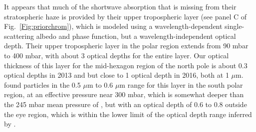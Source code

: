 \documentclass[article,11pt]{emulateapj}
\def\mum{$\mu$m }
\def\mumx{$\mu$m}
\begin{document}
It appears that much of the shortwave
absorption that is missing from their stratospheric haze is provided
by their upper tropospheric layer (see panel C of
Fig.\ \ref{Fig:priorchrom}), which is modeled using a wavelength-dependent 
single-scattering albedo and phase function, but a wavelength-independent
optical depth.  Their upper tropospheric layer in the polar region
extends from 90 mbar to 400 mbar, with about 3 optical depths for the entire
layer. Our optical thickness of this layer for
the mid-hexagon region of the north pole is about 0.3 optical depths
in 2013 and but close to 1 optical depth in 2016, both at 1 \mumx.
\cite{Sro2020spole} found particles in the 0.5 \mum to 0.6 \mum range
for this layer in the south polar region, at an effective pressure
near 300 mbar, which is somewhat deeper than the 245 mbar mean
pressure of \cite{Perez-Hoyos2005}, but with an optical depth of 0.6
to 0.8 outside the eye region, which is within the lower limit of
the optical depth range inferred by \cite{Perez-Hoyos2005}.
\end{document}
